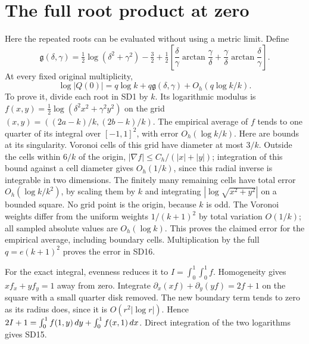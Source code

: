\section{The full root product at zero}
Here the repeated roots can be evaluated without using a metric limit.
Define
\begin{equation}\tag{SD15}
\mathfrak g(\delta,\gamma)=
\tfrac12\log(\delta^2+\gamma^2)-\tfrac32
+\tfrac12\left[\frac\delta\gamma\arctan\frac\gamma\delta
+\frac\gamma\delta\arctan\frac\delta\gamma\right].
\end{equation}
At every fixed original multiplicity,
\begin{equation}\tag{SD16}
\boxed{\log|Q(0)|=q\log k+q\mathfrak g(\delta,\gamma)
+O_h(q\log k/k).}
\end{equation}
To prove it, divide each root in SD1 by $k$. Its logarithmic modulus is
$f(x,y)=\tfrac12\log(\delta^2x^2+\gamma^2y^2)$ on the grid
$(x,y)=((2a-k)/k,(2b-k)/k)$. The empirical average of $f$ tends to
one quarter of its integral over $[-1,1]^2$, with error
$O_h(\log k/k)$. Here are bounds at its singularity. Voronoi cells
of this grid have diameter at most $3/k$. Outside the cells within
$6/k$ of the origin, $|\nabla f|\le C_h/(|x|+|y|)$; integration
of this bound against a cell diameter gives $O_h(1/k)$, since this
radial inverse is integrable in two dimensions. The finitely many
remaining cells have total error $O_h(\log k/k^2)$, by scaling them
by $k$ and integrating $|\log\sqrt{x^2+y^2}|$ on a bounded square.
No grid point is the origin, because $k$ is odd. The Voronoi weights
differ from the uniform weights $1/(k+1)^2$ by total variation
$O(1/k)$; all sampled absolute values are $O_h(\log k)$. This proves
the claimed error for the empirical average, including boundary cells.
Multiplication by the full $q=e(k+1)^2$ proves the error in SD16.

For the exact integral, evenness reduces it to $I=\int_0^1\int_0^1f$.
Homogeneity gives $xf_x+yf_y=1$ away from zero. Integrate
$\partial_x(xf)+\partial_y(yf)=2f+1$ on the square with a small
quarter disk removed. The new boundary term tends to zero as its
radius does, since it is $O(r^2|\log r|)$. Hence
$2I+1=\int_0^1f(1,y)\,d y+\int_0^1f(x,1)\,d x$.
Direct integration of the two logarithms gives SD15.


